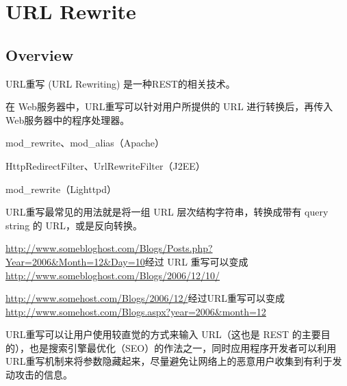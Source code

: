 \part{URL Rewrite}



\chapter{Overview}


URL重写 (URL Rewriting) 是一种REST的相关技术。

在 Web服务器中，URL重写可以针对用户所提供的 URL 进行转换后，再传入 Web服务器中的程序处理器。

\begin{compactitem}
\item mod\_rewrite、mod\_alias（Apache）
\item HttpRedirectFilter、UrlRewriteFilter（J2EE）
\item mod\_rewrite（Lighttpd）
\end{compactitem}

URL重写最常见的用法就是将一组 URL 层次结构字符串，转换成带有 query string 的 URL，或是反向转换。

\begin{compactitem}
\item \url{http://www.somebloghost.com/Blogs/Posts.php?Year=2006\&Month=12\&Day=10}经过 URL 重写可以变成\url{http://www.somebloghost.com/Blogs/2006/12/10/}

\item \url{http://www.somehost.com/Blogs/2006/12/}经过URL重写可以变成\url{http://www.somehost.com/Blogs.aspx?year=2006\&month=12}
\end{compactitem}

URL重写可以让用户使用较直觉的方式来输入 URL（这也是 REST 的主要目的），也是搜索引擎最优化（SEO）的作法之一，同时应用程序开发者可以利用URL重写机制来将参数隐藏起来，尽量避免让网络上的恶意用户收集到有利于发动攻击的信息。





